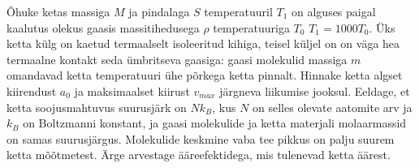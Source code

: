 \documentclass[a4paper,11pt,twocolumn]{article}
\begin{document}
\begin{question}[EuPhO 2017, T2]
	Õhuke ketas massiga \( M \) ja pindalaga \( S \) temperatuuril \( T_1 \) on alguses paigal kaalutus olekus gaasis massitihedusega \( \rho \) temperatuuriga \( T_0 \) \(T_1=1000T_0\). Üks ketta külg on kaetud termaalselt isoleeritud kihiga, teisel küljel on on väga hea termaalne kontakt seda ümbritseva gaasiga: gaasi molekulid massiga \( m \) omandavad ketta temperatuuri ühe põrkega ketta pinnalt. Hinnake ketta algset kiirendust \( a_0 \) ja maksimaalset kiirust \( v_{max} \) järgneva liikumise jooksul. Eeldage, et ketta soojusmahtuvus suurusjärk on \( Nk_B \), kus \( N \) on selles olevate aatomite arv ja \( k_B \) on Boltzmanni konstant, ja gaasi molekulide ja ketta materjali molaarmassid on samas suurusjärgus. Molekulide keskmine vaba tee pikkus on palju suurem ketta mõõtmetest. Ärge arvestage ääreefektidega, mis tulenevad ketta äärest.
\end{question} 
\end{document}
